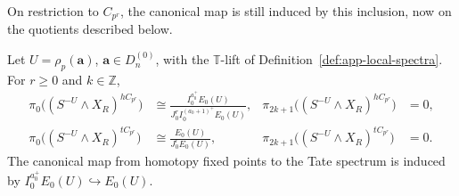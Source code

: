 On restriction to $C_{p^r}$, the canonical map is still induced by this
inclusion, now on the quotients described below.

\begin{proposition}\label{prop:app-finite-comparison}
Let $U=\rho_p(\mathbf a)$, $\mathbf a\in D_n^{(0)}$,
with the $\mathbb T$-lift of Definition~\ref{def:app-local-spectra}.
For $r\geq0$ and $k\in\mathbb Z$,
\begin{align}
 \pi_0\bigl((S^{-U}\wedge X_R)^{hC_{p^r}}\bigr)&\cong
 \frac{I_0^{a_0^+}E_0(U)}{J_0^r I_0^{(a_0+1)^+}E_0(U)},
 &\pi_{2k+1}\bigl((S^{-U}\wedge X_R)^{hC_{p^r}}\bigr)&=0,
 \label{eq:app-finite-borel}\\
 \pi_0\bigl((S^{-U}\wedge X_R)^{tC_{p^r}}\bigr)&\cong \frac{E_0(U)}{J_0^rE_0(U)},
 &\pi_{2k+1}\bigl((S^{-U}\wedge X_R)^{tC_{p^r}}\bigr)&=0.
 \label{eq:app-finite-tate}
\end{align}
The canonical map from homotopy fixed points to the Tate spectrum is induced by
$I_0^{a_0^+}E_0(U)\hookrightarrow E_0(U)$.
\end{proposition}


